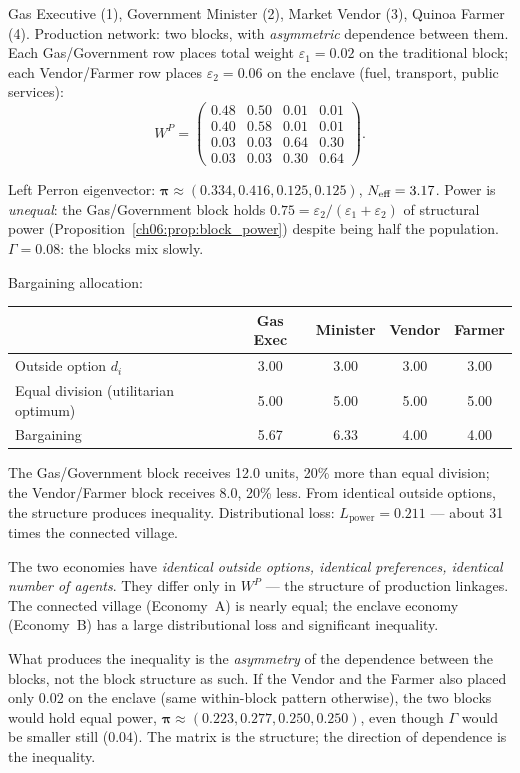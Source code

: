 \documentclass[../structural_economics_book.tex]{subfiles}
\begin{document}
Gas Executive (1), Government Minister (2), Market Vendor (3), Quinoa Farmer (4). Production network: two blocks, with \textit{asymmetric} dependence between them. Each Gas/Government row places total weight $\varepsilon_1 = 0.02$ on the traditional block; each Vendor/Farmer row places $\varepsilon_2 = 0.06$ on the enclave (fuel, transport, public services):
\begin{equation}
W^P = \begin{pmatrix} 0.48 & 0.50 & 0.01 & 0.01 \\ 0.40 & 0.58 & 0.01 & 0.01 \\ 0.03 & 0.03 & 0.64 & 0.30 \\ 0.03 & 0.03 & 0.30 & 0.64 \end{pmatrix}.
\end{equation}

Left Perron eigenvector: $\boldsymbol{\pi} \approx (0.334, 0.416, 0.125, 0.125)$, $N_{\text{eff}} = 3.17$. Power is \textit{unequal}: the Gas/Government block holds $0.75 = \varepsilon_2/(\varepsilon_1 + \varepsilon_2)$ of structural power (Proposition~\ref{ch06:prop:block_power}) despite being half the population. $\Gamma = 0.08$: the blocks mix slowly.

Bargaining allocation:
\begin{center}
\begin{tabular}{lcccc}
\toprule
& Gas Exec & Minister & Vendor & Farmer \\
\midrule
Outside option $d_i$ & 3.00 & 3.00 & 3.00 & 3.00 \\
Equal division (utilitarian optimum) & 5.00 & 5.00 & 5.00 & 5.00 \\
Bargaining & 5.67 & 6.33 & 4.00 & 4.00 \\
\bottomrule
\end{tabular}
\end{center}

The Gas/Government block receives 12.0 units, 20\% more than equal division; the Vendor/Farmer block receives 8.0, 20\% less. From identical outside options, the structure produces inequality. Distributional loss: $L_{\text{power}} = 0.211$ --- about 31 times the connected village.

\begin{keyinsight}
The two economies have \textit{identical outside options, identical preferences, identical number of agents}. They differ only in $W^P$ --- the structure of production linkages. The connected village (Economy~A) is nearly equal; the enclave economy (Economy~B) has a large distributional loss and significant inequality.

What produces the inequality is the \textit{asymmetry} of the dependence between the blocks, not the block structure as such. If the Vendor and the Farmer also placed only $0.02$ on the enclave (same within-block pattern otherwise), the two blocks would hold equal power, $\boldsymbol{\pi} \approx (0.223, 0.277, 0.250, 0.250)$, even though $\Gamma$ would be smaller still ($0.04$). The matrix is the structure; the direction of dependence is the inequality.
\end{keyinsight}
\end{document}

